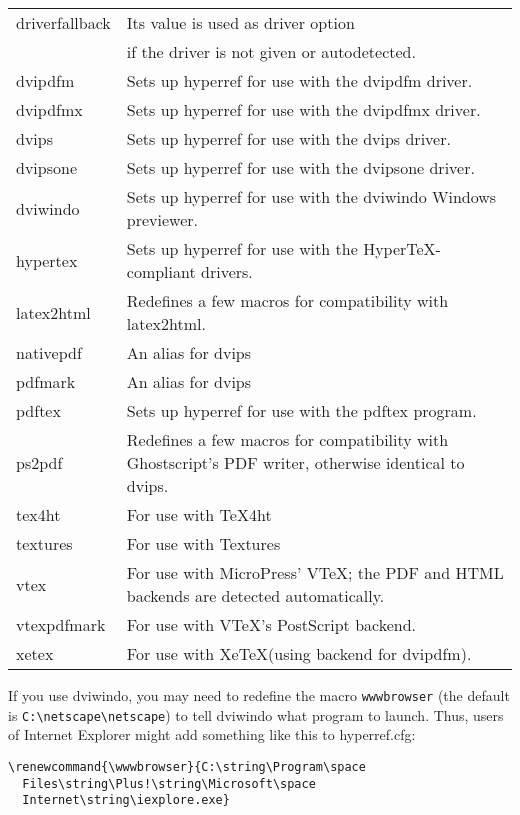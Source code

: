 \documentclass[pdftex]{article}
\newcommand{\bs}{\symbol{'134}}%
\newcommand{\ci}[1]{\texttt{\bs#1}}
\begin{document}
\begin{longtable}{@{}>{\ttfamily}lp{.8\hsize}@{}}
driverfallback & Its value is used as driver option\\
            & if the driver is not given or autodetected.\\
dvipdfm     & Sets up \textsf{hyperref} for use with the \textsf{dvipdfm} driver.\\
dvipdfmx    & Sets up \textsf{hyperref} for use with the \textsf{dvipdfmx} driver.\\
dvips       & Sets up \textsf{hyperref} for use with the \textsf{dvips} driver. \\
dvipsone    & Sets up \textsf{hyperref} for use with the \textsf{dvipsone} driver. \\
dviwindo    & Sets up \textsf{hyperref} for use with the \textsf{dviwindo} Windows previewer. \\
hypertex    & Sets up \textsf{hyperref} for use with the Hyper\TeX-compliant drivers. \\
latex2html  & Redefines a few macros for compatibility with \textsf{latex2html}. \\
nativepdf   & An alias for \textsf{dvips} \\
pdfmark     & An alias for \textsf{dvips} \\
pdftex      & Sets up \textsf{hyperref} for use with the \textsf{pdftex} program.\\
ps2pdf      & Redefines a few macros for compatibility with
              Ghostscript's PDF writer, otherwise identical to
              \textsf{dvips}. \\
tex4ht      & For use with \textsf{\TeX4ht} \\
textures    & For use with \textsf{Textures} \\
vtex        & For use with MicroPress' \textsf{VTeX}; the PDF
                       and HTML backends are detected automatically. \\
vtexpdfmark & For use with \textsf{VTeX}'s PostScript backend. \\
xetex       & For use with Xe\TeX (using backend for dvipdfm).
\end{longtable}
\smallskip

If you use \textsf{dviwindo}, you may need to redefine the macro
\ci{wwwbrowser} (the default is \verb|C:\netscape\netscape|) to tell
\textsf{dviwindo} what program to launch. Thus, users of Internet
Explorer might add something like this to hyperref.cfg:

\begin{verbatim}
\renewcommand{\wwwbrowser}{C:\string\Program\space
  Files\string\Plus!\string\Microsoft\space
  Internet\string\iexplore.exe}
\end{verbatim}
\end{document}
